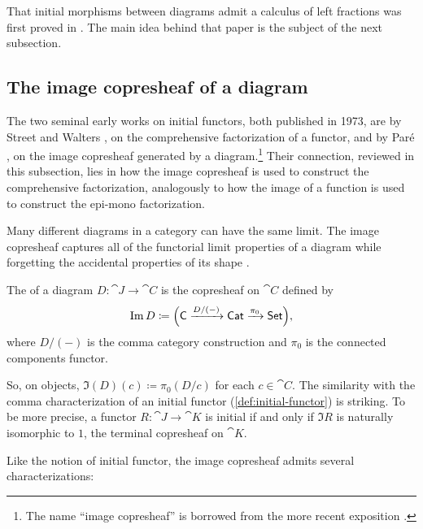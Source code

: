 \documentclass[11pt]{article}
\numberwithin{equation}{section}
\begin{document}
That initial morphisms between diagrams admit a calculus of left fractions was
first proved in \cite[\S{3}, p.\ 32]{pare1973}. The main idea behind that paper
is the subject of the next subsection.

\subsection{The image copresheaf of a diagram}

The two seminal early works on initial functors, both published in 1973, are by
Street and Walters \cite{street1973}, on the comprehensive factorization of a
functor, and by Par{\'e} \cite{pare1973}, on the image copresheaf generated by a
diagram.\footnote{The name ``image copresheaf'' is borrowed from the more recent
  exposition \cite[\S{3}]{perrone2022}.} Their connection, reviewed in this
subsection, lies in how the image copresheaf is used to construct the
comprehensive factorization, analogously to how the image of a function is used
to construct the epi-mono factorization.

Many different diagrams in a category can have the same limit. The image
copresheaf captures all of the functorial limit properties of a diagram while
forgetting the accidental properties of its shape \cite[cf.][\S{0}]{pare1973}.

\begin{definition}
  \label{def:image-copresheaf}
  The  of a diagram $D: \cat{J} \to \cat{C}$ is the
  copresheaf on $\cat{C}$ defined by
  \begin{equation*}
    \operatorname{Im} D \coloneqq \Big(\mathsf{C} \xrightarrow{D/(-)} \mathsf{Cat} \xrightarrow{\pi_0} \mathsf{Set}\Big),
  \end{equation*}
  where $D/(-)$ is the comma category construction and $\pi_0$ is the connected
  components functor.
\end{definition}

So, on objects, $\Im(D)(c) \coloneqq \pi_0(D/c)$ for each $c \in \cat{C}$. The
similarity with the comma characterization of an initial functor
(\cref{def:initial-functor}) is striking. To be more precise, a functor
$R: \cat{J} \to \cat{K}$ is initial if and only if $\Im R$ is naturally isomorphic
to $1$, the terminal copresheaf on $\cat{K}$.

Like the notion of initial functor, the image copresheaf admits several
characterizations:
\end{document}
